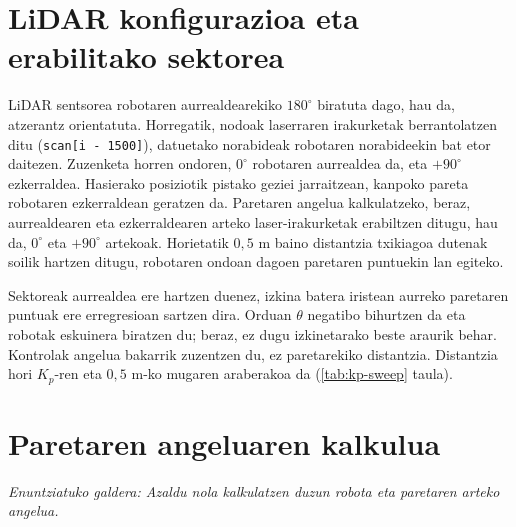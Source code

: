\enlargethispage{3\baselineskip}
\setlength{\parskip}{2.5pt plus 1pt minus 1pt}
\setlength{\abovedisplayskip}{3pt plus 1pt minus 1pt}
\setlength{\belowdisplayskip}{3pt plus 1pt minus 1pt}

\section[LiDAR konfigurazioa]{LiDAR konfigurazioa eta erabilitako sektorea}\label{sec:lidar-konfigurazioa}
LiDAR sentsorea robotaren aurrealdearekiko $180^\circ$ biratuta dago, hau da, atzerantz orientatuta. Horregatik, nodoak laserraren irakurketak berrantolatzen ditu (\texttt{scan[i - 1500]}), datuetako norabideak robotaren norabideekin bat etor daitezen. Zuzenketa horren ondoren, $0^\circ$ robotaren aurrealdea da, eta $+90^\circ$ ezkerraldea. Hasierako posiziotik pistako geziei jarraitzean, kanpoko pareta robotaren ezkerraldean geratzen da. Paretaren angelua kalkulatzeko, beraz, aurrealdearen eta ezkerraldearen arteko laser-irakurketak erabiltzen ditugu, hau da, $0^\circ$ eta $+90^\circ$ artekoak. Horietatik $0{,}5\text{ m}$ baino distantzia txikiagoa dutenak soilik hartzen ditugu, robotaren ondoan dagoen paretaren puntuekin lan egiteko.

Sektoreak aurrealdea ere hartzen duenez, izkina batera iristean aurreko paretaren puntuak ere erregresioan sartzen dira. Orduan $\theta$ negatibo bihurtzen da eta robotak eskuinera biratzen du; beraz, ez dugu izkinetarako beste araurik behar. Kontrolak angelua bakarrik zuzentzen du, ez paretarekiko distantzia. Distantzia hori $K_p$-ren eta $0{,}5\text{ m}$-ko mugaren araberakoa da (\ref{tab:kp-sweep} taula).

\section{Paretaren angeluaren kalkulua}\label{sec:angeluaren-kalkulua}
\noindent\textit{Enuntziatuko galdera: Azaldu nola kalkulatzen duzun robota eta paretaren arteko angelua.}\par

